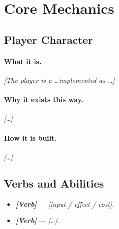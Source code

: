 \setlength{\headheight}{13.59999pt}

\section{Core Mechanics}


\subsection{Player Character}

\paragraph{What it is.}
\textit{[The player is a \ldots implemented as \ldots]}

\paragraph{Why it exists this way.}
\textit{[\ldots]}

\paragraph{How it is built.}
\textit{[\ldots]}

\subsection{Verbs and Abilities}


\begin{itemize}
    \item \textbf{\textit{[Verb]}} --- \textit{[input / effect / cost].}
    \item \textbf{\textit{[Verb]}} --- \textit{[\ldots].}
\end{itemize}

